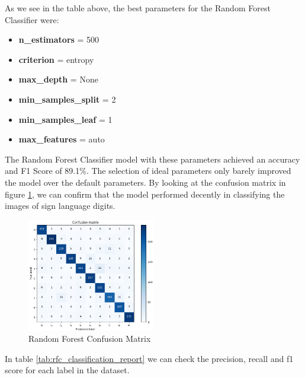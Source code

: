 \documentclass[conference]{IEEEtran}
\begin{document}
As we see in the table above, the best parameters for the Random Forest Classifier were:

\begin{itemize}
    \item \textbf{n\_estimators} = 500
    \item \textbf{criterion} = entropy
    \item \textbf{max\_depth} = None
    \item \textbf{min\_samples\_split} = 2
    \item \textbf{min\_samples\_leaf} = 1
    \item \textbf{max\_features} = auto
\end{itemize}

The Random Forest Classifier model with these parameters achieved an accuracy and F1 Score of 89.1\%. The selection of ideal parameters only barely improved the model over the default parameters.
By looking at the confusion matrix in figure \ref{fig:rf_confusion_matrix}, we can confirm that the model performed decently in classifying the images of sign language digits.
\begin{figure}[!h]
    \centering
    \includegraphics[width=0.5\textwidth]{assets/rfc-confusion-matrix.png}
    \caption{Random Forest Confusion Matrix}
    \label{fig:rf_confusion_matrix}
\end{figure}

In table \ref{tab:rfc_classification_report} we can check the precision, recall and f1 score for each label in the dataset.
\end{document}
